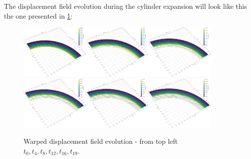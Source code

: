 The displacement field evolution during the cylinder expansion will look
like this the one presented in \cref{bar-sd}:

\begin{figure}[h!]
\centering
\includegraphics[width=0.3\textwidth]{./Images/nl-ep-t0.png}\includegraphics[width=0.3\textwidth]{./Images/nl-ep-t4.png}\includegraphics[width=0.3\textwidth]{./Images/nl-ep-t8.png}\\
\includegraphics[width=0.3\textwidth]{./Images/nl-ep-t12.png}\includegraphics[width=0.3\textwidth]{./Images/nl-ep-t16.png}\includegraphics[width=0.3\textwidth]{./Images/nl-ep-t19.png}
\caption{Warped displacement field evolution - from top left $t_0,t_4,t_8,t_{12},t_{16},t_{19}$. \label{bar-sd}}
\end{figure}

